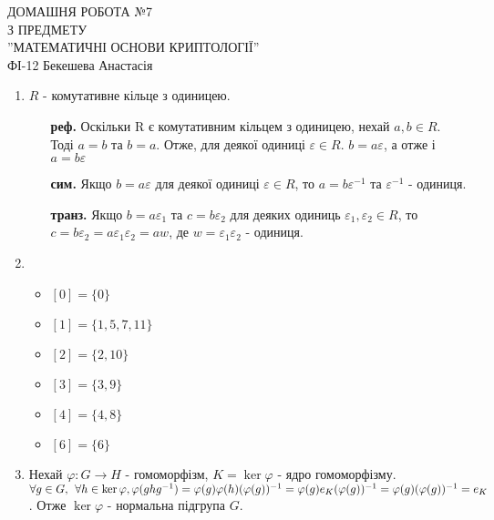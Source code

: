 \documentclass[a4paper,12pt]{article}
\begin{document}
	\begin{justify}
		\thispagestyle{empty}\setlength{\parindent}{0pt}
 		\vspace*{\fill}
  		\begin{center}
  			\noindent\makebox[\linewidth]{\rule{\paperwidth}{0.4pt}}
   			\LARGE{\bigbreak ДОМАШНЯ РОБОТА №7\\З ПРЕДМЕТУ\\''МАТЕМАТИЧНІ ОСНОВИ КРИПТОЛОГІЇ''\\\bigbreak} 
   			ФІ-12 Бекешева Анастасія 
   			\noindent\makebox[\linewidth]{\rule{\paperwidth}{0.4pt}}
  		\end{center}
 		\vspace*{\fill}\newpage
 		\begin{enumerate}
 			\item $R$ - комутативне кільце з одиницею.
 			\begin{itemize}
 				\item [\textbf{реф.}]  Оскільки R є комутативним кільцем з одиницею, нехай $a,b\in R$. Тоді $a=b$ та $b=a$. Отже, для деякої одиниці $\varepsilon\in R$. $b=a\varepsilon$, а отже і $a=b\varepsilon$ 	
 				\item [\textbf{сим.}] Якщо $b=a\varepsilon$ для деякої одиниці $\varepsilon\in R$, то $a=b\varepsilon^{-1}$ та $\varepsilon^{-1}$ - одиниця.
 				\item [\textbf{транз.}] Якщо $b=a\varepsilon_1$ та $c=b\varepsilon_2$ для деяких одиниць $\varepsilon_1,\varepsilon_2\in R$, то $c=b\varepsilon_2=a\varepsilon_1\varepsilon_2=aw$, де $w=\varepsilon_1\varepsilon_2$ - одиниця.  
 			\end{itemize}
 			\item \begin{itemize}
 				\item $[0]=\{0\}$
 				\item $[1]=\{1,5,7,11\}$
 				\item $[2]=\{2,10\}$
 				\item $[3]=\{3,9\}$
 				\item $[4]=\{4,8\}$
 				\item $[6]=\{6\}$
 			\end{itemize}
 			\item Нехай $\varphi:G\to H$ - гомоморфізм, $K=\ker\varphi$ - ядро гомоморфізму. $\forall g\in G,\>\>\forall h\in\ker\varphi,\\ \varphi(ghg^{-1})=\varphi(g)\varphi(h)(\varphi(g))^{-1}=\varphi(g)e_K(\varphi(g))^{-1}=\varphi(g)(\varphi (g))^{-1}=e_K$. Отже $\ker\varphi$ - нормальна підгрупа $G$. 

\end{enumerate}
\end{justify}
\end{document}
